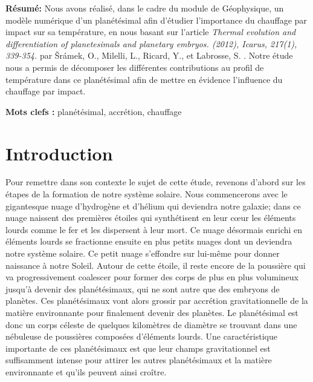 \documentclass[10pt,a4paper]{article}
\numberwithin{equation}{section}
\begin{document}
\begin{titlepage}
\vspace{0.5cm}

\textbf{Résumé:} 
Nous avons réalisé, dans le cadre du module de Géophysique, un modèle numérique d'un planétésimal afin d'étudier l'importance du chauffage par impact sur sa température, en nous basant sur l'article \textit{Thermal evolution and differentiation of planetesimals and planetary embryos. (2012), Icarus, 217(1), 339-354.} par Šrámek, O., Milelli, L., Ricard, Y., et Labrosse, S. .  Notre étude nous a permis de décomposer les différentes contributions au profil de température dans ce planétésimal afin de mettre en évidence l'influence du chauffage par impact.
\vspace{0.3cm}

\textbf{Mots clefs :} planétésimal, accrétion, chauffage
\vspace{0.3cm}



\tableofcontents

\end{titlepage}


\newpage
\renewcommand\thepage{\arabic{page}}

\setcounter{page}{1}

\section{Introduction}

Pour remettre dans son contexte le sujet de cette étude, revenons d'abord sur les étapes de la formation de notre système solaire. Nous commencerons avec le gigantesque nuage d'hydrogène et d'hélium qui deviendra notre galaxie; dans ce nuage naissent des premières étoiles qui synthétisent en leur cœur les éléments lourds comme le fer et les dispersent à leur mort. Ce nuage désormais enrichi en éléments lourds se fractionne ensuite en plus petits nuages dont un deviendra notre système solaire. Ce petit nuage s'effondre sur lui-même pour donner naissance à notre Soleil. Autour de cette étoile, il reste encore de la poussière qui va progressivement coalescer pour former des corps de plus en plus volumineux jusqu'à devenir des planétésimaux, qui ne sont autre que des embryons de planètes. Ces planétésimaux vont alors grossir par accrétion gravitationnelle de la matière environnante pour finalement devenir des planètes. Le planétésimal est donc un corps céleste de quelques kilomètres de diamètre se trouvant dans une nébuleuse de poussières composées d'éléments lourds. Une caractéristique importante de ces planétésimaux est que leur champs gravitationnel est suffisamment intense pour attirer les autres planétésimaux et la matière environnante et qu'ils peuvent ainsi croître.
\end{document}
